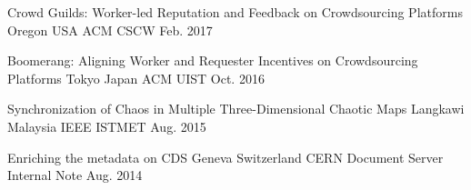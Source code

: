 

\begin{cventries}

  \cvpublications
    {Crowd Guilds: Worker-led Reputation and Feedback on Crowdsourcing Platforms} %
    {Oregon USA}
    {ACM CSCW} %
    {Feb. 2017} %


  \cvpublications
    {Boomerang: Aligning Worker and Requester Incentives on Crowdsourcing Platforms} %
    {Tokyo Japan}
    {ACM UIST} %
    {Oct. 2016} %

  \cvpublications
    {Synchronization of Chaos in Multiple Three-Dimensional Chaotic Maps} %
    {Langkawi Malaysia}
    {IEEE ISTMET} %
    {Aug. 2015} %

  \cvpublications
    {Enriching the metadata on CDS} %
    {Geneva Switzerland}
    {CERN Document Server Internal Note} %
    {Aug. 2014} %

\end{cventries}
